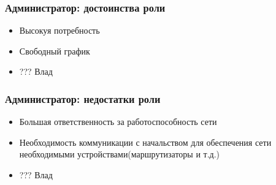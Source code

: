 \documentclass{../industrial-development}
\begin{document}
	\begin{frame} \frametitle{Администратор: достоинства роли}
		\begin{itemize}
			\item Высокуя потребность
			\item Свободный график
			\item  ??? Влад
		\end{itemize}
	\end{frame}

	\begin{frame} \frametitle{Администратор: недостатки роли}
		\begin{itemize}
			\item Большая ответственность за работоспособность сети
			\item Необходимость коммуникации с начальством для обеспечения сети необходимыми устройствами(маршрутизаторы и т.д.)
			\item  ??? Влад
		\end{itemize}
	\end{frame}

	
	
\end{document}
